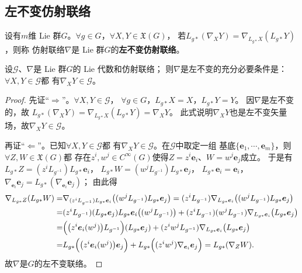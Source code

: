  

\subsection{左不变仿射联络}\label{chlg:sec_lic}

\begin{definition}\label{chlg:def_lic}
    设有$m$维 Lie 群$G$。$\forall g\in G$，$\forall X,Y\in \mathfrak{X}(G)$，
    若$L_{g*}(\nabla_X Y) = \nabla_{L_{g*}X}(L_{g*}Y)$，则称
    仿射联络$\nabla$是 Lie 群$G$的\textbf{左不变仿射联络}。
\end{definition}

\begin{theorem}\label{chlg:thm_lic}
    设$\mathscr{G}$、$\nabla$是 Lie 群$G$的 Lie 代数和仿射联络；
    则$\nabla$是左不变的充分必要条件是：$\forall X,Y \in \mathscr{G}$都
    有$\nabla_X Y\in \mathscr{G}$。
\end{theorem}
\begin{proof}
    先证“$\Rightarrow$”。$\forall X,Y \in \mathscr{G}$，
    $\forall g\in G$，$L_{g*} X = X$，$L_{g*} Y = Y$。
    因$\nabla$是左不变的，故
    $    L_{g*}(\nabla_X Y) = \nabla_{L_{g*}X}(L_{g*}Y) = \nabla_{X}Y $。
    此式说明$\nabla_X Y$也是左不变矢量场，故$\nabla_X Y\in \mathscr{G}$。
    
    再证“$\Leftarrow$”。已知$\forall X,Y \in \mathscr{G}$都
    有$\nabla_X Y\in \mathscr{G}$。在$\mathscr{G}$中取定一组
    基底$\{\boldsymbol{e}_1,\cdots,\boldsymbol{e}_m\}$，则$\forall Z,W\in \mathfrak{X}(G)$都
    存在$z^i,w^j\in C^\infty(G)$使得$Z=z^i \boldsymbol{e}_i$、$W=w^j \boldsymbol{e}_j$成立。    于是有
    $L_{g*}Z = (z^i L_{g^{-1}}) L_{g*} \boldsymbol{e}_i$，
    $L_{g*}W = (w^j L_{g^{-1}}) L_{g*} \boldsymbol{e}_j$，
    $L_{g*}\boldsymbol{e}_i = \boldsymbol{e}_i$，
    $\nabla_{\boldsymbol{e}_i} \boldsymbol{e}_j = L_{g*}(\nabla_{\boldsymbol{e}_i} \boldsymbol{e}_j)$；
    由此得 
    \begin{align*}
        \nabla_{L_{g*}Z} (L_{g*}W)= & \nabla_{(z^i L_{g^{-1}}) L_{g*} \boldsymbol{e}_i }
        \bigl( (w^j L_{g^{-1}}) L_{g*} \boldsymbol{e}_j \bigr)
        =(z^i L_{g^{-1}}) \nabla_{ L_{g*} \boldsymbol{e}_i }\bigl( (w^j L_{g^{-1}}) L_{g*} \boldsymbol{e}_j \bigr) \\
        =&(z^i L_{g^{-1}}) (L_{g*} \boldsymbol{e}_j) L_{g*} \boldsymbol{e}_i \bigl( (w^j L_{g^{-1}})  \bigr)
        + (z^i L_{g^{-1}}) (w^j L_{g^{-1}})  \nabla_{ L_{g*} \boldsymbol{e}_i }\bigl( L_{g*} \boldsymbol{e}_j \bigr) \\
        =& \Bigl( \bigl(z^i \boldsymbol{e}_i(w^j) \bigr)L_{g^{-1}}\Bigr) (L_{g*} \boldsymbol{e}_j)
        + (z^i w^j L_{g^{-1}}) \nabla_{ L_{g*} \boldsymbol{e}_i }\bigl( L_{g*} \boldsymbol{e}_j \bigr)  \\
        =& L_{g*}\Bigl( \bigl(z^i \boldsymbol{e}_i(w^j) \bigr) \boldsymbol{e}_j \Bigr)
        +L_{g*}\Bigl( (z^i w^j ) \nabla_{\boldsymbol{e}_i} \boldsymbol{e}_j\Bigr)
        =L_{g*} (\nabla_Z W ) .
    \end{align*}
    故$\nabla$是$G$的左不变联络。
\end{proof}


